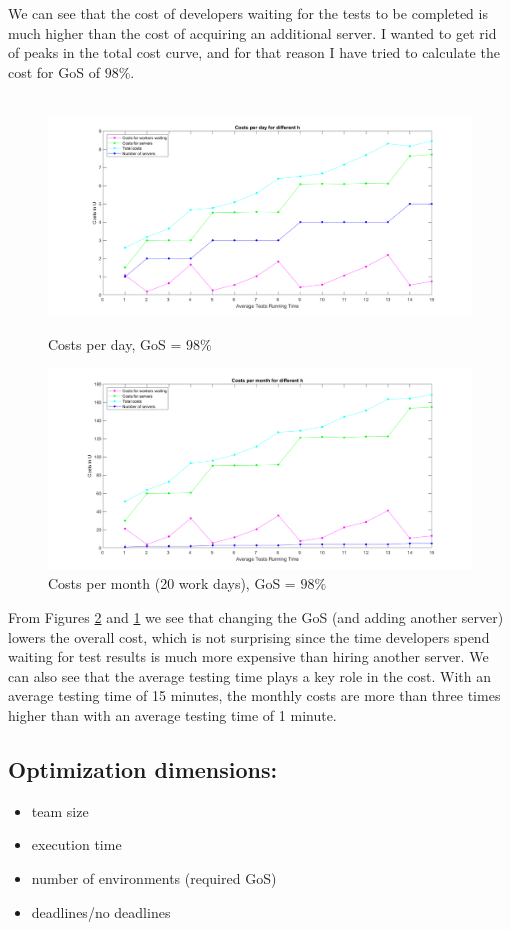 \documentclass[a4paper]{article}
\begin{document}
 We can see that the cost of developers waiting for the tests to be completed is much higher than the cost of acquiring an additional server. I wanted to get rid of peaks in the total cost curve, and for that reason I have tried to calculate the cost for GoS of $98\%$. 

\begin{figure}[h!]
\hbox{\hspace{-2cm} \includegraphics[scale=0.5]{plots/costs98.png}}
\caption{Costs per day, GoS = $98 \%$}
\label{costs98_day}
\end{figure} 

\begin{figure}[h!]
\hbox{\hspace{-2cm}\includegraphics[scale=0.5]{plots/costs98_month.png}}
\caption{Costs per month (20 work days), GoS = $98 \%$}
\label{costs98_month}
\end{figure} 

From Figures \ref{costs98_month} and \ref{costs98_day} we see that changing the GoS (and adding another server) lowers the overall cost, which is not surprising since the time developers spend waiting for test results is much more expensive than hiring another server. 
We can also see that the average testing time plays a key role in the cost. With an average testing time of 15 minutes, the monthly costs are more than three times higher than with an average testing time of 1 minute.

\subsection{Optimization dimensions:}
\begin{itemize}
\item team size
\item execution time
\item number of environments (required GoS)
\item deadlines/no deadlines

\end{itemize}
\end{document}
